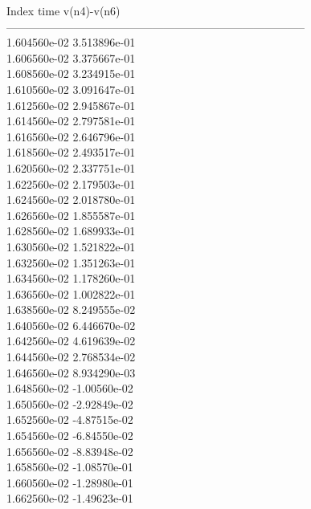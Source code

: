 Index   time            v(n4)-v(n6)     \\ \hline
--------------------------------------------------------------------------------\\ 	1.604560e-02	3.513896e-01	\\ 	1.606560e-02	3.375667e-01	\\ 	1.608560e-02	3.234915e-01	\\ 	1.610560e-02	3.091647e-01	\\ 	1.612560e-02	2.945867e-01	\\ 	1.614560e-02	2.797581e-01	\\ 	1.616560e-02	2.646796e-01	\\ 	1.618560e-02	2.493517e-01	\\ 	1.620560e-02	2.337751e-01	\\ 	1.622560e-02	2.179503e-01	\\ 	1.624560e-02	2.018780e-01	\\ 	1.626560e-02	1.855587e-01	\\ 	1.628560e-02	1.689933e-01	\\ 	1.630560e-02	1.521822e-01	\\ 	1.632560e-02	1.351263e-01	\\ 	1.634560e-02	1.178260e-01	\\ 	1.636560e-02	1.002822e-01	\\ 	1.638560e-02	8.249555e-02	\\ 	1.640560e-02	6.446670e-02	\\ 	1.642560e-02	4.619639e-02	\\ 	1.644560e-02	2.768534e-02	\\ 	1.646560e-02	8.934290e-03	\\ 	1.648560e-02	-1.00560e-02	\\ 	1.650560e-02	-2.92849e-02	\\ 	1.652560e-02	-4.87515e-02	\\ 	1.654560e-02	-6.84550e-02	\\ 	1.656560e-02	-8.83948e-02	\\ 	1.658560e-02	-1.08570e-01	\\ 	1.660560e-02	-1.28980e-01	\\ 	1.662560e-02	-1.49623e-01	\\ \hline
